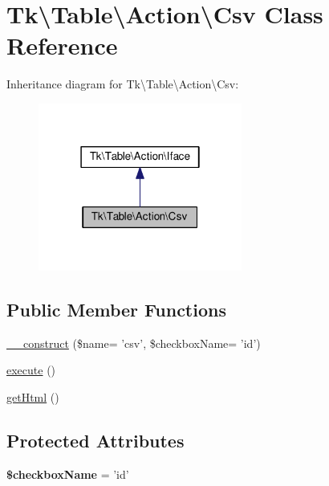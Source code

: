 \hypertarget{classTk_1_1Table_1_1Action_1_1Csv}{\section{Tk\textbackslash{}Table\textbackslash{}Action\textbackslash{}Csv Class Reference}
\label{classTk_1_1Table_1_1Action_1_1Csv}
}


Inheritance diagram for Tk\textbackslash{}Table\textbackslash{}Action\textbackslash{}Csv\+:\nopagebreak
\begin{figure}[H]
\begin{center}
\leavevmode
\includegraphics[width=190pt]{classTk_1_1Table_1_1Action_1_1Csv__inherit__graph}
\end{center}
\end{figure}
\subsection*{Public Member Functions}
\begin{DoxyCompactItemize}
\item 
\hyperlink{classTk_1_1Table_1_1Action_1_1Csv_a79bcb8e4e9eabd68d6f3ddee19e5baf1}{\+\_\+\+\_\+construct} (\$name= 'csv', \$checkbox\+Name= 'id')
\item 
\hyperlink{classTk_1_1Table_1_1Action_1_1Csv_a31f5863b31f521b484ac874f37c783d6}{execute} ()
\item 
\hyperlink{classTk_1_1Table_1_1Action_1_1Csv_a1bcda4d0684a52def0aa6917bd1b9292}{get\+Html} ()
\end{DoxyCompactItemize}
\subsection*{Protected Attributes}
\begin{DoxyCompactItemize}
\item 
\hypertarget{classTk_1_1Table_1_1Action_1_1Csv_ad1cc4240c977306d4c93244c85bb0233}{{\bfseries \$checkbox\+Name} = 'id'}\label{classTk_1_1Table_1_1Action_1_1Csv_ad1cc4240c977306d4c93244c85bb0233}

\end{DoxyCompactItemize}


